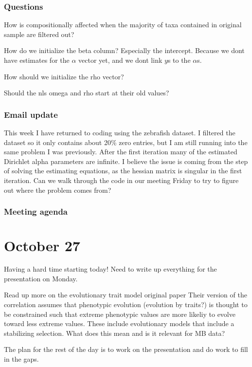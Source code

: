 \documentclass[10pt]{article}
\begin{document}
\subsubsection*{Questions}
How is compositionally affected when the majority of taxa contained in original sample are filtered out?

How do we initialize the beta column? Especially the intercept. Because we dont have estimates for the $\alpha$ vector yet, and we dont link $y$s to the $\alpha$s.

How should we initialize the rho vector?

Should the nls omega and rho start at their old values?

\subsubsection*{Email update}
This week I have returned to coding using the zebrafish dataset. I filtered the dataset so it only contains about 20\% zero entries, but I am still running into the same problem I was previously. After the first iteration many of the estimated Dirichlet alpha parameters are infinite. I believe the issue is coming from the step of solving the estimating equations, as the hessian matrix is singular in the first iteration. Can we walk through the code in our meeting Friday to try to figure out where the problem comes from?

\subsubsection*{Meeting agenda}

\hrulefill

\section{October 27}

Having a hard time starting today! Need to write up everything for the presentation on Monday.

Read up more on the evolutionary trait model original paper \cite{Martins1997}
Their version of the correlation assumes that phenotypic evolution (evolution by traits?) is thought to be constrained such that extreme phenotypic values are more likeliy to evolve toward less extreme values. These include evolutionary models that include a stabilizing selection. What does this mean and is it relevant for MB data?

The plan for the rest of the day is to work on the presentation and do work to fill in the gaps.
\end{document}
